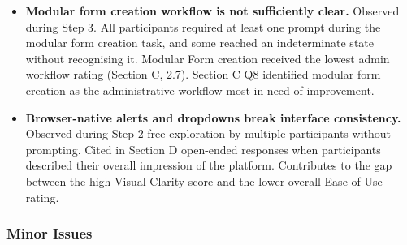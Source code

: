 \documentclass[12pt]{article}
\begin{document}
\begin{itemize}
    \item \textbf{Modular form creation workflow is not sufficiently clear.} Observed during Step 3. All participants required at least one prompt during the modular form creation task, and some reached an indeterminate state without recognising it. Modular Form creation received the lowest admin workflow rating (Section C, 2.7). Section C Q8 identified modular form creation as the administrative workflow most in need of improvement.

    \item \textbf{Browser-native alerts and dropdowns break interface consistency.} Observed during Step 2 free exploration by multiple participants without prompting. Cited in Section D open-ended responses when participants described their overall impression of the platform. Contributes to the gap between the high Visual Clarity score and the lower overall Ease of Use rating.
\end{itemize}

\subsubsection{Minor Issues}
\end{document}
